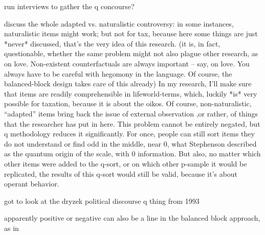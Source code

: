 run interviews to gather the q concourse?

discuss the whole adapted vs. naturalistic controversy: in some instances, naturalistic items might work; but not for tax, because here some things are just *never* discussed, that's the very idea of this research.
(it is, in fact, questionable, whether the same problem might not also plague other research, as on love. Non-existent counterfactuals are always important – say, on love. You always have to be careful with hegomony in the language. Of course, the balanced-block design takes care of this already)
In my research, I'll make sure that items are readily comprehensible in lifeworld-terms, which, luckily *is* very possible for taxation, because it is about the oikos.
Of course, non-naturalistic, ``adapted'' items bring back the issue of external observation ,or rather, of things that the researcher has put in here. This problem cannot be entirely negated, but q methodology reduces it significantly.
For once, people can still sort items they do not understand or find odd in the middle, near 0, what Stephenson described as the quantum origin of the scale, with 0 information.
But also, no matter which other items were added to the q-sort, or on which other p-sample it would be replicated, the results of this q-sort would still be valid, because it's about operant behavior.

got to look at the dryzek political discourse q thing from 1993

apparently positive or negative can also be a line in the balanced block approach, as in \citep[23]{McKeown2013}


